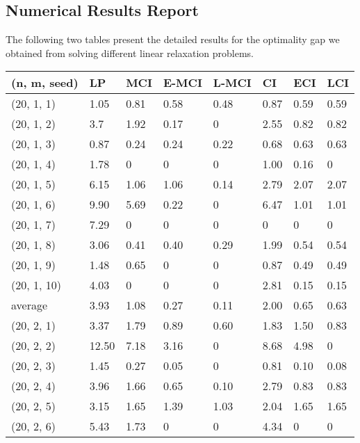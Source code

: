 \begin{appendices}
\section{Numerical Results Report}
\label{subsec: detailed_data}
The following two tables present the detailed results for the optimality gap we obtained from solving different linear relaxation problems. 

\begin{table}[H]
\centering
\vspace{-0.4cm}
\begin{tabular}{  p{1.6cm} | p{0.8cm} | p{1cm} p{1cm} p{1cm} | p{1cm} p{1cm} p{1cm} }
\hline
(n, m, seed) & LP   & MCI & E-MCI & L-MCI &  CI & ECI & LCI \\ 
\midrule
(20, 1, 1) & 1.05   & 0.81   &  0.58 & 0.48  & 0.87  &  0.59 &  0.59 \\
(20, 1, 2) & 3.7   & 1.92  & 0.17  &  0 & 2.55  &  0.82 &  0.82 \\
(20, 1, 3) &  0.87  &  0.24 & 0.24  & 0.22  & 0.68  & 0.63  & 0.63  \\
(20, 1, 4) & 1.78   &  0 & 0  & 0  & 1.00  & 0.16  & 0  \\
(20, 1, 5) & 6.15   &  1.06 & 1.06  & 0.14  &  2.79 & 2.07  & 2.07  \\
(20, 1, 6) & 9.90    & 5.69  & 0.22  & 0  & 6.47  & 1.01  & 1.01  \\
(20, 1, 7) &   7.29  & 0  &  0 & 0  &  0 &  0 & 0  \\
(20, 1, 8) & 3.06   & 0.41  & 0.40  & 0.29  & 1.99  & 0.54  &  0.54 \\
(20, 1, 9) & 1.48   & 0.65  &  0 & 0 & 0.87  & 0.49  & 0.49  \\
(20, 1, 10) & 4.03   & 0  & 0  & 0  & 2.81  &  0.15 & 0.15  \\
\midrule
average & 3.93   & 1.08  & 0.27  & 0.11  & 2.00  & 0.65  & 0.63  \\
\bottomrule
(20, 2, 1) & 3.37   & 1.79  & 0.89  & 0.60  & 1.83  & 1.50  & 0.83  \\
(20, 2, 2) &  12.50   & 7.18  &  3.16 & 0 & 8.68  & 4.98  &  0 \\
(20, 2, 3) &  1.45  &  0.27 & 0.05  & 0  & 0.81  & 0.10  & 0.08  \\
(20, 2, 4) & 3.96   &  1.66 &  0.65 & 0.10  &  2.79 & 0.83  &  0.83 \\
(20, 2, 5) & 3.15   &  1.65  & 1.39   & 1.03  & 2.04  & 1.65  &  1.65 \\
(20, 2, 6) &  5.43  & 1.73  & 0  & 0  & 4.34  &  0 &  0 \\

\end{tabular}
\end{table}
\end{appendices}

